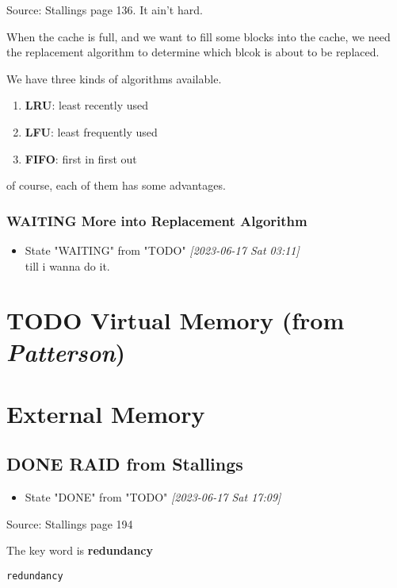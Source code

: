 \documentclass[11pt]{article}
\begin{document}
Source: Stallings page 136. It ain't hard.

When the cache is full, and we want to fill some blocks into the cache, we need the replacement algorithm to determine which blcok is about to be replaced. 

We have three kinds of algorithms available.
\begin{enumerate}
\item \textbf{LRU}: least recently used
\item \textbf{LFU}: least frequently used
\item \textbf{FIFO}: first in first out
\end{enumerate}
of course, each of them has some advantages.

\subsubsection{{\bfseries\sffamily WAITING} More into Replacement Algorithm}
\label{sec:org8b23ff3}

\begin{itemize}
\item State "WAITING"    from "TODO"       \textit{[2023-06-17 Sat 03:11] } \\
till i wanna do it.
\end{itemize}
\section{{\bfseries\sffamily TODO} Virtual Memory (from \emph{Patterson})}
\label{sec:org6c32028}
\section{External Memory}
\label{sec:org8743782}
\subsection{{\bfseries\sffamily DONE} RAID from Stallings}
\label{sec:org9dfb34e}
\begin{itemize}
\item State "DONE"       from "TODO"       \textit{[2023-06-17 Sat 17:09]}
\end{itemize}
Source: Stallings page 194

The key word is \textbf{redundancy}

\begin{verbatim}
redundancy
\end{verbatim}
\end{document}
